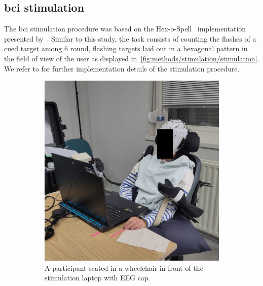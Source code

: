 \documentclass[twocolumn]{article}
\begin{document}
\subsection{\Acs{bci} stimulation}

The \ac{bci} stimulation procedure was based on the
Hex-o-Spell~\cite{Treder2010} implementation presented
by~\textcite{VanDenKerchove2024}.
Similar to this study, the task consists of counting the flashes of a cued
target among 6 round, flashing targets laid out in a hexagonal pattern in the
field of view of the user as displayed
in~\cref{fig:methods/stimulation/stimulation}.
We refer to \textcite{VanDenKerchove2024} for further implementation details of
the stimulation procedure.
\begin{figure}[t]
  \centering
  \begin{subfigure}[b]{.41\textwidth}
    \includegraphics[width=\textwidth]{figures/PD01b-obfuscated.jpg}
    \caption{A participant seated in a wheelchair in front of the stimulation laptop with EEG
    cap.}
  \end{subfigure}\hfill%
  \begin{minipage}[b]{.54\textwidth}
    \begin{subfigure}[b]{.45\linewidth}

\end{subfigure}
\end{minipage}
\end{figure}
\end{document}
